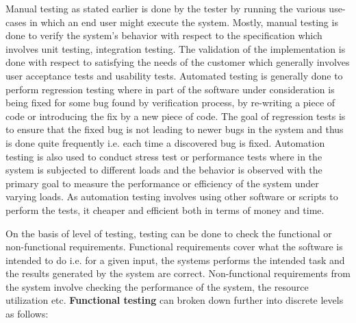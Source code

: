 Manual testing as stated earlier is done by the tester by running the various use-cases in which an end user might execute the system. Mostly, manual testing is done to verify the system's behavior with respect to the specification which involves unit testing, integration testing. The validation of the implementation is done with respect to satisfying the needs of the customer which generally involves user acceptance tests and usability tests. Automated testing is generally done to perform regression testing where in part of the software under consideration is being fixed for some bug found by verification process, by re-writing a piece of code or introducing the fix by a new piece of code. The goal of regression tests is to ensure that the fixed bug is not leading to newer bugs in the system and thus is done quite frequently i.e. each time a discovered bug is fixed. Automation testing is also used to conduct stress test or performance tests where in the system is subjected to different loads and the behavior is observed with the primary goal to measure the performance or efficiency of the system under varying loads. As automation testing involves using other software or scripts to perform the tests, it cheaper and efficient both in terms of money and time. \newline 

On the basis of level of testing, testing can be done to check the functional or non-functional requirements. Functional requirements cover what the software is intended to do i.e. for a given input, the systems performs the intended task and the results generated by the system are correct. Non-functional requirements from the system involve checking the performance of the system, the resource utilization etc. \textbf{Functional testing} can broken down further into discrete levels as follows: 

